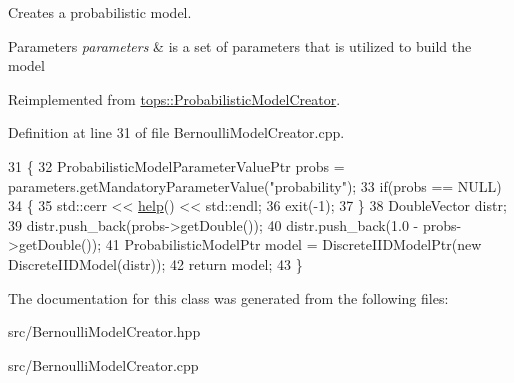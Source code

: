 Creates a probabilistic model. 


\begin{DoxyParams}{Parameters}
{\em parameters} & is a set of parameters that is utilized to build the model \\
\hline
\end{DoxyParams}


Reimplemented from \hyperlink{classtops_1_1ProbabilisticModelCreator_afed6c8ffa45fff446bdaa8b533da8f7c}{tops\+::\+Probabilistic\+Model\+Creator}.



Definition at line 31 of file Bernoulli\+Model\+Creator.\+cpp.


\begin{DoxyCode}
31                                                                                                      \{
32     ProbabilisticModelParameterValuePtr probs = parameters.getMandatoryParameterValue(\textcolor{stringliteral}{"probability"});
33     \textcolor{keywordflow}{if}(probs == NULL)
34       \{
35         std::cerr << \hyperlink{classtops_1_1BernoulliModelCreator_a7b95b973ccc98192f835e98b656cd6ee}{help}() << std::endl;
36         exit(-1);
37       \}
38     DoubleVector distr;
39     distr.push\_back(probs->getDouble());
40     distr.push\_back(1.0 - probs->getDouble());
41     ProbabilisticModelPtr model = DiscreteIIDModelPtr(\textcolor{keyword}{new} DiscreteIIDModel(distr));
42     \textcolor{keywordflow}{return} model;
43   \}
\end{DoxyCode}


The documentation for this class was generated from the following files\+:\begin{DoxyCompactItemize}
\item 
src/Bernoulli\+Model\+Creator.\+hpp\item 
src/Bernoulli\+Model\+Creator.\+cpp\end{DoxyCompactItemize}
